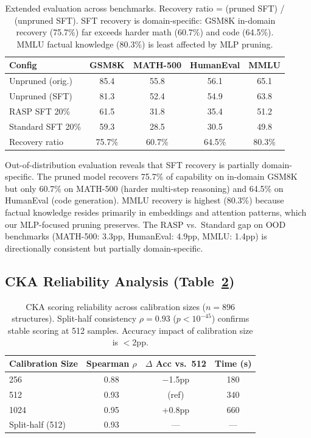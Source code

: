 \documentclass[11pt,a4paper]{article}
\begin{document}
\begin{table}[t]
\centering
\small
\begin{tabular}{lcccc}
\toprule
\textbf{Config} & \textbf{GSM8K} & \textbf{MATH-500} & \textbf{HumanEval} & \textbf{MMLU} \\
\midrule
Unpruned (orig.) & 85.4 & 55.8 & 56.1 & 65.1 \\
Unpruned (SFT) & 81.3 & 52.4 & 54.9 & 63.8 \\
\midrule
RASP SFT 20\% & 61.5 & 31.8 & 35.4 & 51.2 \\
Standard SFT 20\% & 59.3 & 28.5 & 30.5 & 49.8 \\
\midrule
Recovery ratio & 75.7\% & 60.7\% & 64.5\% & 80.3\% \\
\bottomrule
\end{tabular}
\caption{Extended evaluation across benchmarks. Recovery ratio = (pruned SFT) / (unpruned SFT). SFT recovery is domain-specific: GSM8K in-domain recovery (75.7\%) far exceeds harder math (60.7\%) and code (64.5\%). MMLU factual knowledge (80.3\%) is least affected by MLP pruning.}
\label{tab:extended}
\end{table}

Out-of-distribution evaluation reveals that SFT recovery is partially domain-specific. The pruned model recovers 75.7\% of capability on in-domain GSM8K but only 60.7\% on MATH-500 (harder multi-step reasoning) and 64.5\% on HumanEval (code generation). MMLU recovery is highest (80.3\%) because factual knowledge resides primarily in embeddings and attention patterns, which our MLP-focused pruning preserves. The RASP vs.\ Standard gap on OOD benchmarks (MATH-500: 3.3pp, HumanEval: 4.9pp, MMLU: 1.4pp) is directionally consistent but partially domain-specific.

\subsection{CKA Reliability Analysis (Table~\ref{tab:cka_reliability})}

\begin{table}[t]
\centering
\small
\begin{tabular}{lccc}
\toprule
\textbf{Calibration Size} & \textbf{Spearman $\rho$} & \textbf{$\Delta$ Acc vs.\ 512} & \textbf{Time (s)} \\
\midrule
256 & 0.88 & $-$1.5pp & 180 \\
512 & 0.93 & (ref) & 340 \\
1024 & 0.95 & +0.8pp & 660 \\
\midrule
Split-half (512) & 0.93 & --- & --- \\
\bottomrule
\end{tabular}
\caption{CKA scoring reliability across calibration sizes ($n=896$ structures). Split-half consistency $\rho=0.93$ ($p < 10^{-45}$) confirms stable scoring at 512 samples. Accuracy impact of calibration size is $<$2pp.}
\label{tab:cka_reliability}
\end{table}
\end{document}
